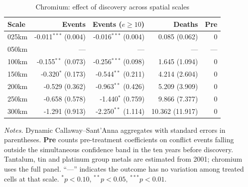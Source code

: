 \begin{table}[H]
\centering
\footnotesize
\caption{Chromium: effect of discovery across spatial scales}
\label{tab:chromium_robustness}
\begin{tabular}{lrrrr}
\toprule
\textbf{Scale} & \textbf{Events} & \textbf{Events ($e\geq10$)} & \textbf{Deaths} & \textbf{Pre} \\
\midrule
025km & -0.011$^{***}$ (0.004) & -0.016$^{***}$ (0.004) & 0.085 (0.062) & 0 \\
050km & --- & --- & --- & --- \\
100km & -0.155$^{**}$ (0.073) & -0.256$^{***}$ (0.098) & 1.645 (1.094) & 0 \\
150km & -0.320$^{*}$ (0.173) & -0.544$^{**}$ (0.211) & 4.214 (2.604) & 0 \\
200km & -0.529 (0.362) & -0.963$^{**}$ (0.426) & 5.209 (3.909) & 0 \\
250km & -0.658 (0.578) & -1.440$^{*}$ (0.759) & 9.866 (7.377) & 0 \\
300km & -1.291 (0.913) & -2.250$^{**}$ (1.114) & 10.362 (11.917) & 0 \\
\bottomrule
\end{tabular}
\begin{minipage}{0.92\textwidth}\vspace{4pt}\scriptsize \textit{Notes.} Dynamic Callaway--Sant'Anna aggregates with standard errors in parentheses. \textbf{Pre} counts pre-treatment coefficients on conflict events falling outside the simultaneous confidence band in the ten years before discovery. Tantalum, tin and platinum group metals are estimated from 2001; chromium uses the full panel. ``---'' indicates the outcome has no variation among treated cells at that scale. $^{*}p<0.10$, $^{**}p<0.05$, $^{***}p<0.01$.\end{minipage}
\end{table}
